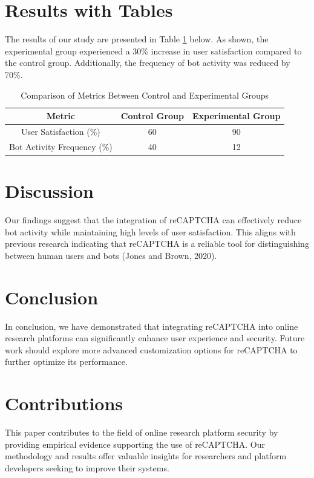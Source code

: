 \documentclass{article}
\begin{document}
\section{Results with Tables}
The results of our study are presented in Table \ref{tab:results} below. As shown, the experimental group experienced a 30\% increase in user satisfaction compared to the control group. Additionally, the frequency of bot activity was reduced by 70\%.

\begin{table}[h!]
\centering
\begin{tabular}{|c|c|c|}
\hline
\textbf{Metric} & \textbf{Control Group} & \textbf{Experimental Group} \\
\hline
User Satisfaction (\%) & 60 & 90 \\
\hline
Bot Activity Frequency (\%) & 40 & 12 \\
\hline
\end{tabular}
\caption{Comparison of Metrics Between Control and Experimental Groups}
\label{tab:results}
\end{table}

\section{Discussion}
Our findings suggest that the integration of reCAPTCHA can effectively reduce bot activity while maintaining high levels of user satisfaction. This aligns with previous research indicating that reCAPTCHA is a reliable tool for distinguishing between human users and bots (Jones and Brown, 2020).

\section{Conclusion}
In conclusion, we have demonstrated that integrating reCAPTCHA into online research platforms can significantly enhance user experience and security. Future work should explore more advanced customization options for reCAPTCHA to further optimize its performance.

\section{Contributions}
This paper contributes to the field of online research platform security by providing empirical evidence supporting the use of reCAPTCHA. Our methodology and results offer valuable insights for researchers and platform developers seeking to improve their systems.
\end{document}
